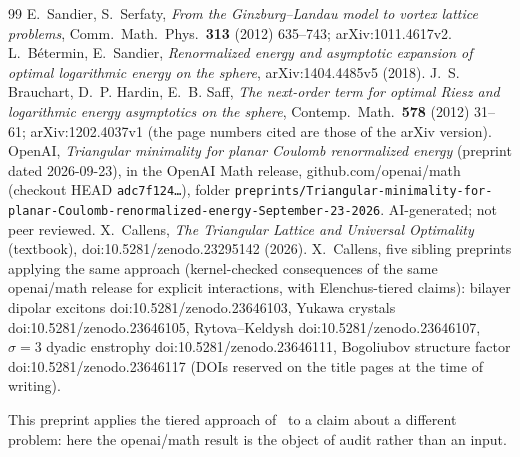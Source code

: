 \documentclass[10pt]{article}
\begin{document}
\begin{thebibliography}{99}\small
{} E.~Sandier, S.~Serfaty, \emph{From the Ginzburg--Landau model to vortex lattice problems}, Comm.\ Math.\ Phys.\ \textbf{313} (2012) 635--743; arXiv:1011.4617v2.
 L.~B\'etermin, E.~Sandier, \emph{Renormalized energy and asymptotic expansion of optimal logarithmic energy on the sphere}, arXiv:1404.4485v5 (2018).
 J.~S. Brauchart, D.~P. Hardin, E.~B. Saff, \emph{The next-order term for optimal Riesz and logarithmic energy asymptotics on the sphere}, Contemp.\ Math.\ \textbf{578} (2012) 31--61; arXiv:1202.4037v1 (the page numbers cited are those of the arXiv version).
 OpenAI, \emph{Triangular minimality for planar Coulomb renormalized energy} (preprint dated 2026-09-23), in the OpenAI Math release, github.com/openai/math (checkout HEAD \texttt{adc7f124\ldots}), folder \texttt{preprints/Triangular-minimality-for-planar-Coulomb-renormalized-energy-September-23-2026}. AI-generated; not peer reviewed.
 X.~Callens, \emph{The Triangular Lattice and Universal Optimality} (textbook), doi:10.5281/zenodo.23295142 (2026).
 X.~Callens, five sibling preprints applying the same approach (kernel-checked consequences of the same openai/math release for explicit interactions, with Elenchus-tiered claims): bilayer dipolar excitons doi:10.5281/zenodo.23646103, Yukawa crystals doi:10.5281/zenodo.23646105, Rytova--Keldysh doi:10.5281/zenodo.23646107, $\sigma=3$ dyadic enstrophy doi:10.5281/zenodo.23646111, Bogoliubov structure factor doi:10.5281/zenodo.23646117 (DOIs reserved on the title pages at the time of writing).
\end{thebibliography}
\noindent This preprint applies the tiered approach of~\cite{txt,ar} to a claim about a different problem: here the openai/math result is the object of audit rather than an input.
\end{document}
